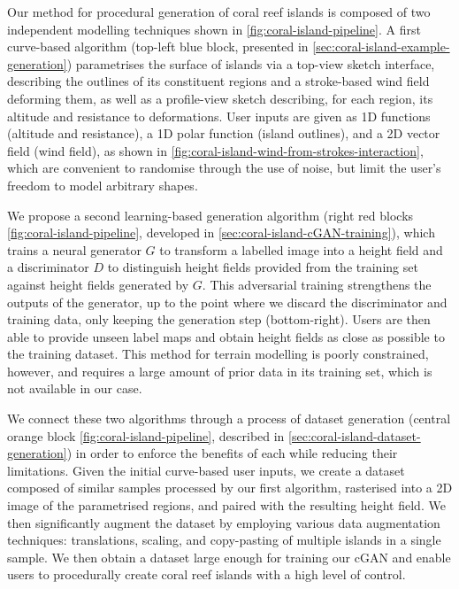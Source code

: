 Our method for procedural generation of coral reef islands is composed of two independent modelling techniques shown in \cref{fig:coral-island-pipeline}. A first curve-based algorithm (top-left blue block, presented in \cref{sec:coral-island-example-generation}) parametrises the surface of islands via a top-view sketch interface, describing the outlines of its constituent regions and a stroke-based wind field deforming them, as well as a profile-view sketch describing, for each region, its altitude and resistance to deformations. User inputs are given as 1D functions (altitude and resistance), a 1D polar function (island outlines), and a 2D vector field (wind field), as shown in \cref{fig:coral-island-wind-from-strokes-interaction}, which are convenient to randomise through the use of noise, but limit the user's freedom to model arbitrary shapes.

We propose a second learning-based generation algorithm (right red blocks \cref{fig:coral-island-pipeline}, developed in \cref{sec:coral-island-cGAN-training}), which trains a neural generator $G$ to transform a labelled image into a height field and a discriminator $D$ to distinguish height fields provided from the training set against height fields generated by $G$. This adversarial training strengthens the outputs of the generator, up to the point where we discard the discriminator and training data, only keeping the generation step (bottom-right). Users are then able to provide unseen label maps and obtain height fields as close as possible to the training dataset. This method for terrain modelling is poorly constrained, however, and requires a large amount of prior data in its training set, which is not available in our case.

We connect these two algorithms through a process of dataset generation (central orange block \cref{fig:coral-island-pipeline}, described in \cref{sec:coral-island-dataset-generation}) in order to enforce the benefits of each while reducing their limitations. Given the initial curve-based user inputs, we create a dataset composed of similar samples processed by our first algorithm, rasterised into a 2D image of the parametrised regions, and paired with the resulting height field. We then significantly augment the dataset by employing various data augmentation techniques: translations, scaling, and copy-pasting of multiple islands in a single sample. We then obtain a dataset large enough for training our cGAN and enable users to procedurally create coral reef islands with a high level of control.

